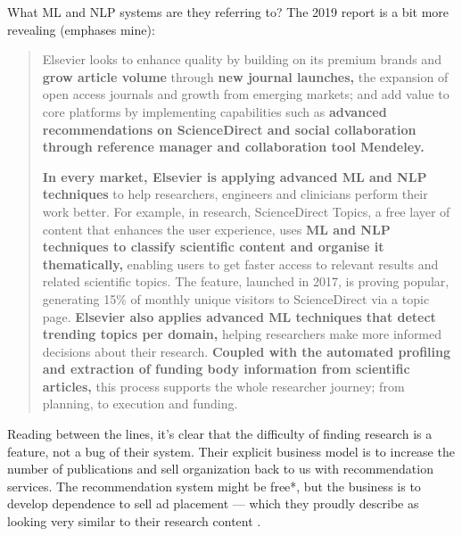 \documentclass[10pt]{tufte-book}
\begin{document}
What ML and NLP systems are they referring to? The 2019 report is a bit
more revealing (emphases mine):

\begin{quote}
Elsevier looks to enhance quality by building on its premium brands and
\textbf{grow article volume} through \textbf{new journal launches,} the
expansion of open access journals and growth from emerging markets; and
add value to core platforms by implementing capabilities such as
\textbf{advanced recommendations on ScienceDirect and social
collaboration through reference manager and collaboration tool
Mendeley.}

\textbf{In every market, Elsevier is applying advanced ML and NLP
techniques} to help researchers, engineers and clinicians perform their
work better. For example, in research, ScienceDirect Topics, a free
layer of content that enhances the user experience, uses \textbf{ML and
NLP techniques to classify scientific content and organise it
thematically,} enabling users to get faster access to relevant results
and related scientific topics. The feature, launched in 2017, is proving
popular, generating 15\% of monthly unique visitors to ScienceDirect via
a topic page. \textbf{Elsevier also applies advanced ML techniques that
detect trending topics per domain,} helping researchers make more
informed decisions about their research. \textbf{Coupled with the
automated profiling and extraction of funding body information from
scientific articles,} this process supports the whole researcher
journey; from planning, to execution and funding. \citep{RELXAnnualReport2019} 
\end{quote}

Reading between the lines, it's clear that the difficulty of finding
research is a feature, not a bug of their system. Their explicit
business model is to increase the number of publications and sell
organization back to us with recommendation services. The recommendation
system might be free*, but the business is to develop dependence to sell
ad placement --- which they proudly describe as looking very similar to
their research content \citep{springernatureBrandedContent, elsevier360AdvertisingSolutions} .
\end{document}
